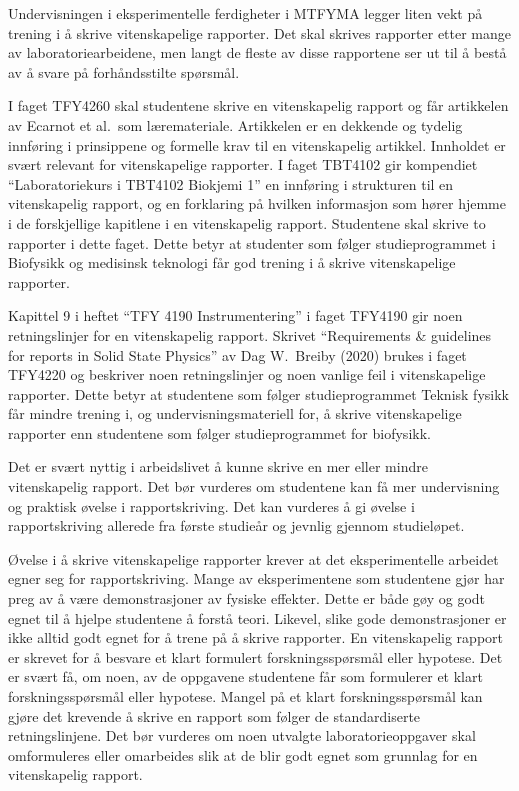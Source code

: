 \documentclass{article}
\begin{document}
Undervisningen i eksperimentelle ferdigheter i MTFYMA legger liten vekt på trening i å skrive vitenskapelige rapporter. Det skal skrives rapporter etter mange av laboratoriearbeidene, men langt de fleste av disse rapportene ser ut til å bestå av å svare på forhåndsstilte spørsmål.

I faget TFY4260 skal studentene skrive en vitenskapelig rapport og får artikkelen av Ecarnot et al.~som læremateriale. Artikkelen er en dekkende og tydelig innføring i prinsippene og formelle krav til en vitenskapelig artikkel. Innholdet er svært relevant for vitenskapelige rapporter. I faget TBT4102 gir kompendiet ``Laboratoriekurs i TBT4102 Biokjemi 1'' en innføring i strukturen til en vitenskapelig rapport, og en forklaring på hvilken informasjon som hører hjemme i de forskjellige kapitlene i en vitenskapelig rapport. Studentene skal skrive to rapporter i dette faget. Dette betyr at studenter som følger studieprogrammet i Biofysikk og medisinsk teknologi får god trening i å skrive vitenskapelige rapporter.

Kapittel 9 i heftet ``TFY 4190 Instrumentering'' i faget TFY4190 gir noen retningslinjer for en vitenskapelig rapport. Skrivet ``Requirements \& guidelines for reports in Solid State Physics'' av Dag W.~Breiby (2020) brukes i faget TFY4220 og beskriver noen retningslinjer og noen vanlige feil i vitenskapelige rapporter. Dette betyr at studentene som følger studieprogrammet Teknisk fysikk får mindre trening i, og undervisningsmateriell for, å skrive vitenskapelige rapporter enn studentene som følger studieprogrammet for biofysikk.

Det er svært nyttig i arbeidslivet å kunne skrive en mer eller mindre vitenskapelig rapport.
Det bør vurderes om studentene kan få mer undervisning og praktisk øvelse i rapportskriving. Det kan vurderes å gi øvelse i rapportskriving allerede fra første studieår og jevnlig gjennom studieløpet.

Øvelse i å skrive vitenskapelige rapporter krever at det eksperimentelle arbeidet egner seg for rapportskriving. Mange av eksperimentene som studentene gjør har preg av å være demonstrasjoner av fysiske effekter. Dette er både gøy og godt egnet til å hjelpe studentene å forstå teori. Likevel, slike gode demonstrasjoner er ikke alltid godt egnet for å trene på å skrive rapporter. En vitenskapelig rapport er skrevet for å besvare et klart formulert forskningsspørsmål eller hypotese. Det er svært få, om noen, av de oppgavene studentene får som formulerer et klart forskningsspørsmål eller hypotese. Mangel på et klart forskningsspørsmål kan gjøre det krevende å skrive en rapport som følger de standardiserte retningslinjene. Det bør vurderes om noen utvalgte laboratorieoppgaver skal omformuleres eller omarbeides slik at de blir godt egnet som grunnlag for en vitenskapelig rapport.
\end{document}
